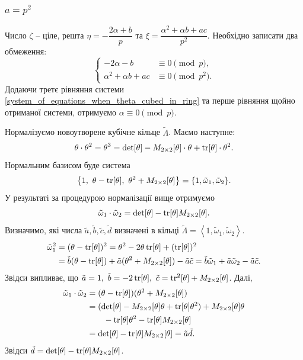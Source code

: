 \documentclass{thesis}
\begin{document}
\subsubsection{$a = p^2$} Число $\zeta$ -- ціле, решта $\eta = -\dfrac{2\alpha + b}{p}$ та $\xi = \dfrac{\alpha^2 + \alpha b + ac}{p^2}$. Необхідно записати два обмеження:
\begin{equation*}
\begin{cases}
-2\alpha - b & \equiv 0 \pmod p, \\
\alpha^2 + \alpha b + ac & \equiv 0 \pmod {p^2}.
\end{cases}
\end{equation*}
Додаючи третє рівняння системи \eqref{system_of_equations_when_theta_cubed_in_ring} та перше рівняння щойно отриманої системи, отримуємо $\alpha \equiv 0 \pmod p$.

Нормалізуємо новоутворене кубічне кільце $\tilde{\Lambda}$. Маємо наступне:
\begin{align*}
\theta \cdot \theta^2 = \theta^3 = \det [\theta] - M_{2 \times 2}[\theta] \cdot \theta + \operatorname{tr}[\theta] \cdot \theta^2.
\end{align*}
Нормальним базисом буде система
\begin{align*}
\left\{ 1,\ \theta-\operatorname{tr}[\theta],\ \theta^2 + M_{2 \times 2}[\theta] \right\} = \{1,\tilde{\omega}_1,\tilde{\omega}_2\}.
\end{align*}
У результаті за процедурою нормалізації вище отримуємо
\begin{align*}
\tilde{\omega}_1 \cdot \tilde{\omega}_2 = \det [\theta] - \operatorname{tr} [\theta] M_{2 \times 2}[\theta].
\end{align*}
Визначимо, які числа $\tilde{a},\tilde{b},\tilde{c},\tilde{d}$ визначені в кільці $\tilde{\Lambda} = \left< 1, \tilde{\omega}_1,\tilde{\omega}_2 \right>$.
\begin{align*}
\tilde{\omega}_1^2 & = (\theta - \operatorname{tr} [\theta])^2 = \theta^2 - 2 \theta \operatorname{tr} [\theta] + (\operatorname{tr} [\theta])^2 \\ 
& = \tilde{b} (\theta - \operatorname{tr} [\theta]) + \tilde{a} (\theta^2 + M_{2 \times 2}[\theta]) - \tilde{a} \tilde{c} = \tilde{b} \tilde{\omega}_1 + \tilde{a} \tilde{\omega}_2 - \tilde{a} \tilde{c}.
\end{align*}
Звідси випливає, що $\tilde{a} = 1,\ \tilde{b} = - 2 \tr [\theta],\ \tilde{c} = \tr^2 [\theta] + M_{2 \times 2}[\theta]$. Далі,
\begin{align*}
\tilde{\omega}_1 \cdot \tilde{\omega}_2 & = (\theta - \operatorname{tr} [\theta])(\theta^2 + M_{2 \times 2}[\theta]) \\
& = (\det [\theta] - M_{2 \times 2}[\theta] \theta + \operatorname{tr} [\theta] \theta^2) + M_{2 \times 2}[\theta] \theta \\
& \qquad - \operatorname{tr}[\theta] \theta^2 - \operatorname{tr} [\theta] M_{2 \times 2}[\theta] \\
& = \det [\theta] - \operatorname{tr} [\theta] M_{2 \times 2}[\theta] = \tilde{a} \tilde{d}.
\end{align*}
Звідси $\tilde{d} = \det [\theta] - \operatorname{tr} [\theta] M_{2 \times 2}[\theta]$.
\end{document}
